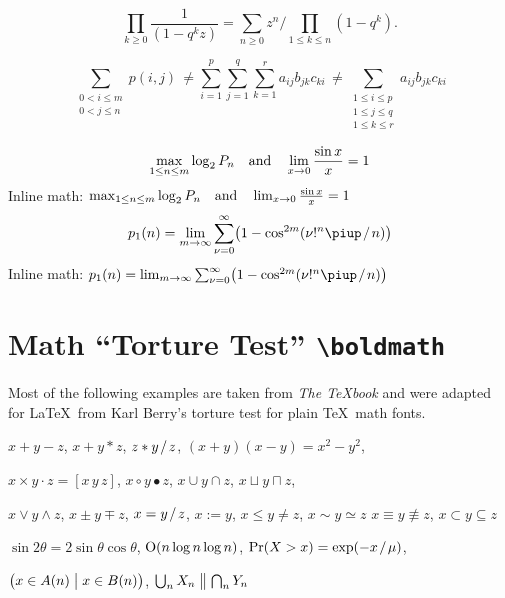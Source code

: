 \documentclass[12pt, a4paper, oneside]{article}
\newcommand*{\divslash}{%
	\mathbin{%
		\nonscript\mskip-2mu / \nonscript\mskip-2mu%
	}%
}  %
\theoremstyle{Plain}
\theoremstyle{Definition}
\theoremstyle{Remark}
\begin{document}
\begin{appendix}

$$\prod_{k\ge0}\frac{1}{(1-q^kz)}=
\sum_{n\ge0}z^n \bigg/ \!\!\prod_{1\le k\le n}(1-q^k).$$

$$\sum_{\substack{\scriptstyle 0< i\le m\\\scriptstyle0<j\le n}}p(i,j) \,\ne
%
%
\sum_{i=1}^p \sum_{j=1}^q \sum_{k=1}^r a_{ij} b_{jk} c_{ki} \,\ne
%
\sum_{\substack{\scriptstyle 1\le i\le p \\ \scriptstyle 1\le j\le q\\
		\scriptstyle 1\le k\le r}} a_{ij} b_{jk} c_{ki}$$

$$\max_{1\le n\le m}\log_2P_n \quad \hbox{and} \quad
\lim_{x\to0}\frac{\sin x}{x}=1$$
Inline math:
$\max_{1\le n\le m}\log_2P_n \quad \hbox{and} \quad
\lim_{x\to0}\frac{\sin x}{x}=1$
$$p_1(n)=\lim_{m\to\infty}\sum_{\nu=0}^\infty\bigl(1-\cos^{2m}(\nu!^n\piup \divslash n)\bigr)$$
Inline math:
$p_1(n)=\lim_{m\to\infty}\sum_{\nu=0}^\infty\bigl(1-\cos^{2m}(\nu!^n\piup \divslash n)\bigr)$

\clearpage

\begingroup
\bfseries\boldmath

\section{Math \texorpdfstring{``}{“}Torture Test\texorpdfstring{''}{”} \texttt{\textbackslash boldmath}}

Most of the following examples are taken from \textit{The \TeX book} \citep[][see \url{https://ctan.org/pkg/texbook}]{knuth:ct:a} and were adapted for \LaTeX\ from Karl Berry's torture test for plain \TeX\ math fonts.

\noindent $x + y - z$, \quad $x + y * z$, \quad $z * y \divslash z$, \quad
$(x+y)(x-y) = x^2 - y^2$,

\noindent $x \times y \cdot z = [x\, y\, z]$, \quad $x\circ y \bullet z$, \quad
$x\cup y \cap z$, \quad $x\sqcup y \sqcap z$, \quad

\noindent $x \vee y \wedge z$, \quad $x\pm y\mp z$, \quad
$x=y \divslash z$, \;\; $x:=y$, \;\; $x\le y \ne z$, \;\; $x \sim y \simeq z$
$x \equiv y \nequiv z$, \;\; $x\subset y \subseteq z$

\noindent $\sin2\theta=2\sin\theta\cos\theta$, \quad
$\hbox{O}(n\log n\log n)$, \quad
$\Pr(X>x)=\exp(-x \divslash \mu)$,

\noindent $\bigl(x\in A(n)\bigm|x\in B(n)\bigr)$, \quad
$\bigcup_n X_n\bigm\|\bigcap_n Y_n$


\end{appendix}
\end{document}
